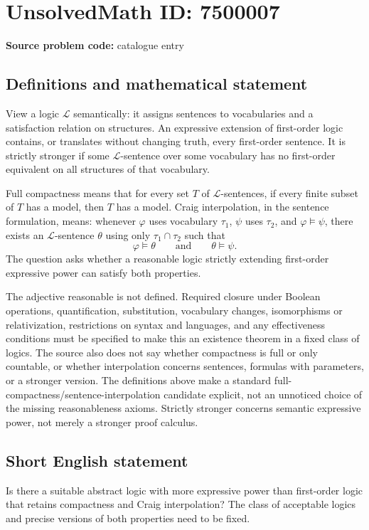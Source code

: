 \documentclass[11pt]{article}
\begin{document}
\section*{UnsolvedMath ID: 7500007}
\textbf{Source problem code:} catalogue entry
\subsection{Definitions and mathematical statement}
View a logic $\mathcal L$ semantically: it assigns sentences to vocabularies and a satisfaction relation on structures. An expressive extension of first-order logic contains, or translates without changing truth, every first-order sentence. It is strictly stronger if some $\mathcal L$-sentence over some vocabulary has no first-order equivalent on all structures of that vocabulary.

Full compactness means that for every set $T$ of $\mathcal L$-sentences, if every finite subset of $T$ has a model, then $T$ has a model. Craig interpolation, in the sentence formulation, means: whenever $\varphi$ uses vocabulary $\tau_1$, $\psi$ uses $\tau_2$, and $\varphi\models\psi$, there exists an $\mathcal L$-sentence $\theta$ using only $\tau_1\cap\tau_2$ such that
\[
\varphi\models\theta\qquad\text{and}\qquad\theta\models\psi.
\]
The question asks whether a reasonable logic strictly extending first-order expressive power can satisfy both properties.

The adjective reasonable is not defined. Required closure under Boolean operations, quantification, substitution, vocabulary changes, isomorphisms or relativization, restrictions on syntax and languages, and any effectiveness conditions must be specified to make this an existence theorem in a fixed class of logics. The source also does not say whether compactness is full or only countable, or whether interpolation concerns sentences, formulas with parameters, or a stronger version. The definitions above make a standard full-compactness/sentence-interpolation candidate explicit, not an unnoticed choice of the missing reasonableness axioms. Strictly stronger concerns semantic expressive power, not merely a stronger proof calculus.
\subsection{Short English statement}
Is there a suitable abstract logic with more expressive power than first-order logic that retains compactness and Craig interpolation? The class of acceptable logics and precise versions of both properties need to be fixed.
\end{document}
